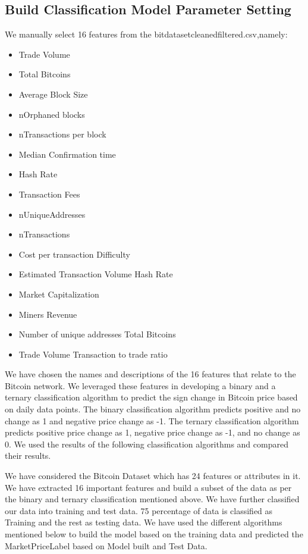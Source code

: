 \documentclass{article}
\begin{document}
\subsection {Build Classification Model Parameter Setting}

We manually select 16 features from the bit\textunderscore dataset\textunderscore cleaned\textunderscore filtered.csv,namely:
\begin{itemize}
\item Trade Volume
\item Total Bitcoins
\item Average Block Size
\item n\textunderscore Orphaned blocks
\item n\textunderscore Transactions per block
\item Median Confirmation time
\item Hash Rate
\item Transaction Fees
\item n\textunderscore Unique\textunderscore Addresses
\item n\textunderscore Transactions    
\item Cost per transaction Difficulty
\item Estimated Transaction Volume Hash Rate
\item Market Capitalization
\item Miners Revenue
\item Number of unique addresses Total Bitcoins
\item Trade Volume Transaction to trade ratio
\end{itemize}

We have chosen the names and descriptions of the 16 features that relate to the Bitcoin network. We leveraged these features in developing a binary and a ternary classification algorithm to predict the sign change in Bitcoin price based on daily data points. The binary classification algorithm predicts positive and no change as 1 and negative price change as -1. The ternary classification algorithm predicts positive price change as 1, negative price change as -1, and no change as 0. We used the results of the following classification algorithms and compared their results.\newline

We have considered the Bitcoin Dataset which has 24 features or attributes in it. We have extracted 16 important features and build a subset of the data as per the binary and ternary classification mentioned above. We have further classified our data into training and test data. 75 percentage of data is classified as Training and the rest as testing data. We have used the different algorithms mentioned below to build the model based on the training data and predicted the Market\textunderscore Price\textunderscore Label based on Model built and Test Data.
\end{document}
